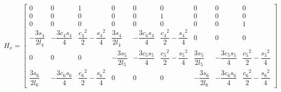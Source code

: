 \documentclass[a4paper,10pt,fleqn]{article}
\begin{document}
\begin{gather}
H_x=
\begin{bmatrix}
	0                   & 0                   & 1                                     & 0                   & 0                   & 0                                     & 0                   & 0                   & 0                                     \\
	0                   & 0                   & 0                                     & 0                   & 0                   & 1                                     & 0                   & 0                   & 0                                     \\
	0                   & 0                   & 0                                     & 0                   & 0                   & 0                                     & 0                   & 0                   & 1                                     \\
	-\dfrac{3s_4}{2l_4} & -\dfrac{3c_4s_4}{4} & \dfrac{{c_4}^2}{2}-\dfrac{{s_4}^2}{4} & \dfrac{3s_4}{2l_4}  & -\dfrac{3c_4s_4}{4} & \dfrac{{c_4}^2}{2}-\dfrac{{s_4}^2}{4} & 0                   & 0                   & 0                                     \\
	0                   & 0                   & 0                                     & -\dfrac{3s_5}{2l_5} & -\dfrac{3c_5s_5}{4} & \dfrac{{c_5}^2}{2}-\dfrac{{s_5}^2}{4} & \dfrac{3s_5}{2l_5}  & -\dfrac{3c_5s_5}{4} & \dfrac{{c_5}^2}{2}-\dfrac{{s_5}^2}{4} \\
	\dfrac{3s_6}{2l_6}  & -\dfrac{3c_6s_6}{4} & \dfrac{{c_6}^2}{2}-\dfrac{{s_6}^2}{4} & 0                   & 0                   & 0                                     & -\dfrac{3s_6}{2l_6} & -\dfrac{3c_6s_6}{4} & \dfrac{{c_6}^2}{2}-\dfrac{{s_6}^2}{4}
\end{bmatrix}
\end{gather}
\end{document}
